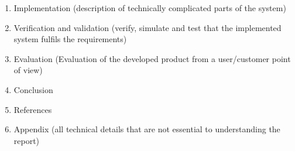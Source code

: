 \begin{enumerate}
\begin{enumerate}
        \end{enumerate}
    \item Implementation (description of technically complicated parts of the system)
    \item Verification and validation (verify, simulate and test that the implemented system fulfils the requirements)
    \item Evaluation (Evaluation of the developed product from a user/customer point of view)
    \item Conclusion
    \item References
    \item Appendix (all technical details that are not essential to understanding the report)
\end{enumerate}
